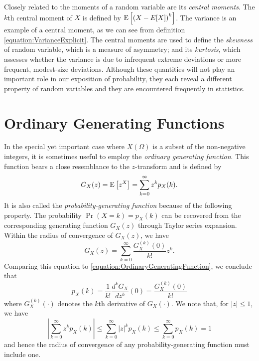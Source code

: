 Closely related to the moments of a random variable are its \emph{central moments}. 
The $k$th central moment of $X$ is defined by $\mathrm{E} \left[ \left( X - E[X] \right)^k \right]$.
The variance is an example of a central moment, as we can see from definition \eqref{equation:VarianceExplicit}.
The central moments are used to define the \emph{skewness} of random variable, which is a measure of asymmetry; and its \emph{kurtosis}, which assesses whether the variance is due to infrequent extreme deviations or more frequent, modest-size deviations.
Although these quantities will not play an important role in our exposition of probability, they each reveal a different property of random variables and they are encountered frequently in statistics. 


\section{Ordinary Generating Functions}
\label{section:OrdinaryGeneratingFunctions}

In the special yet important case where $X(\Omega)$ is a subset of the non-negative integers, it is sometimes useful to employ the \emph{ordinary generating function}. 
This function bears a close resemblance to the $z$-transform and is defined by
\begin{equation} \label{equation:OrdinaryGeneratingFunction}
G_X(z) = \mathrm{E} \left[ z^X \right] = \sum_{k=0}^{\infty} z^k p_X (k) .
\end{equation}
It is also called the \emph{probability-generating function} because of the following property. 
The probability $\Pr (X = k) = p_X(k)$ can be recovered from the corresponding generating function $G_X (z)$ through Taylor series expansion.
Within the radius of convergence of $G_X(z)$, we have
\begin{equation*}
G_X(z) = \sum_{k=0}^{\infty} \frac{G_X^{(k)} (0)}{k!} z^k .
\end{equation*}
Comparing this equation to \eqref{equation:OrdinaryGeneratingFunction}, we conclude that
\begin{equation*}
p_X(k) = \frac{1}{k!} \frac{d^k G_X}{dz^k} (0)
= \frac{G_X^{(k)} (0)}{k!}
\end{equation*}
where $G_X^{(k)} (\cdot)$ denotes the $k$th derivative of $G_X(\cdot)$.
We note that, for $|z| \leq 1$, we have
\begin{equation*}
\left| \sum_{k=0}^{\infty} z^k p_X(k) \right|
\leq \sum_{k=0}^{\infty} |z|^k p_X(k)
\leq \sum_{k=0}^{\infty} p_X(k) = 1
\end{equation*}
and hence the radius of convergence of any probability-generating function must include one.

